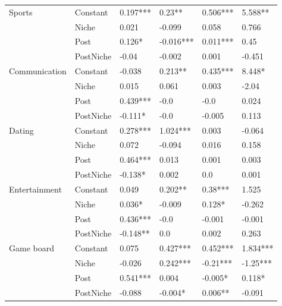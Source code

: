 \begin{longtable}[h!]{llllll}
\cline{1-6}
\multirow{4}{*}{Sports} & Constant &            0.197*** &      0.23** &   0.506*** &    5.588** \\
          & Niche &               0.021 &      -0.099 &      0.058 &      0.766 \\
          & Post &              0.126* &   -0.016*** &   0.011*** &       0.45 \\
          & PostNiche &               -0.04 &      -0.002 &      0.001 &     -0.451 \\
\cline{1-6}
\multirow{4}{*}{Communication} & Constant &              -0.038 &     0.213** &   0.435*** &     8.448* \\
          & Niche &               0.015 &       0.061 &      0.003 &      -2.04 \\
          & Post &            0.439*** &        -0.0 &       -0.0 &      0.024 \\
          & PostNiche &             -0.111* &        -0.0 &     -0.005 &      0.113 \\
\cline{1-6}
\multirow{4}{*}{Dating} & Constant &            0.278*** &    1.024*** &      0.003 &     -0.064 \\
          & Niche &               0.072 &      -0.094 &      0.016 &      0.158 \\
          & Post &            0.464*** &       0.013 &      0.001 &      0.003 \\
          & PostNiche &             -0.138* &       0.002 &        0.0 &      0.001 \\
\cline{1-6}
\multirow{4}{*}{Entertainment} & Constant &               0.049 &     0.202** &    0.38*** &      1.525 \\
          & Niche &              0.036* &      -0.009 &     0.128* &     -0.262 \\
          & Post &            0.436*** &        -0.0 &     -0.001 &     -0.001 \\
          & PostNiche &            -0.148** &         0.0 &      0.002 &      0.263 \\
\cline{1-6}
\multirow{4}{*}{Game board} & Constant &               0.075 &    0.427*** &   0.452*** &   1.834*** \\
          & Niche &              -0.026 &    0.242*** &   -0.21*** &   -1.25*** \\
          & Post &            0.541*** &       0.004 &    -0.005* &     0.118* \\
          & PostNiche &              -0.088 &     -0.004* &    0.006** &     -0.091 \\

\end{longtable}
